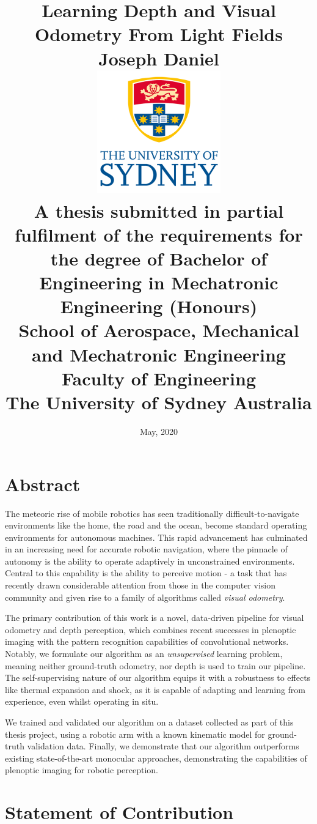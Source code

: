 \documentclass[openany]{book}
\title{
  \LARGE{\textbf{Learning Depth and Visual Odometry From Light Fields}} \\
  \vspace{1cm}
  \Large \textbf{Joseph Daniel} \\
  \vspace{1cm}
  \includegraphics[width=0.4\textwidth]{images/usyd.png} \\
  \vspace{1cm}
  \vspace{0.5cm}
  \small A thesis submitted in partial fulfilment of the requirements for the degree of Bachelor of Engineering in Mechatronic Engineering (Honours) \\
  \vspace{0.5cm}
  \small School of Aerospace, Mechanical and Mechatronic Engineering \\
  \small Faculty of Engineering \\
  \small The University of Sydney Australia
}
\date{May, 2020}
\begin{document}
\frontmatter

\maketitle
\restoregeometry




\chapter*{Abstract}

The meteoric rise of mobile robotics has seen traditionally difficult-to-navigate environments like the home, the road and the ocean, become standard operating environments for autonomous machines. This rapid advancement has culminated in an increasing need for accurate robotic navigation, where the pinnacle of autonomy is the ability to operate adaptively in unconstrained environments. Central to this capability is the ability to perceive motion - a task that has recently drawn considerable attention from those in the computer vision community and given rise to a family of algorithms called \textit{visual odometry}. 

The primary contribution of this work is a novel, data-driven pipeline for visual odometry and depth perception, which combines recent successes in plenoptic imaging with the pattern recognition capabilities of convolutional networks. Notably, we formulate our algorithm as an \textit{unsupervised} learning problem, meaning neither ground-truth odometry, nor depth is used to train our pipeline. The self-supervising nature of our algorithm equips it with a robustness to effects like thermal expansion and shock, as it is capable of adapting and learning from experience, even whilst operating in situ.

We trained and validated our algorithm on a dataset collected as part of this thesis project, using a robotic arm with a known kinematic model for ground-truth validation data. Finally, we demonstrate that our algorithm outperforms existing state-of-the-art monocular approaches, demonstrating the capabilities of plenoptic imaging for robotic perception. 

\chapter*{Statement of Contribution}
\end{document}
